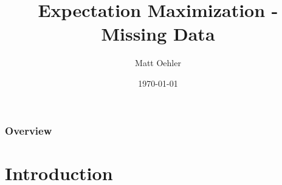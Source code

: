 \documentclass{beamer}
\title[Expectation Maximization]{Expectation Maximization - Missing Data } %
\author{Matt Oehler} %
\institute[BYU] %
{
Brigham Young University \\ %
\medskip

Stat 624 Project 2%

}
\date{\today} %
\begin{document}
\begin{frame}
\titlepage %
\end{frame}


\begin{frame}
\frametitle{Overview} %
\tableofcontents %
\end{frame}


\section{Introduction} %

\end{document}
